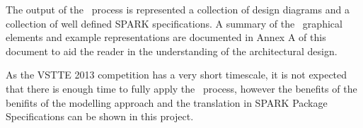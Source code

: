 The output of the \informed\ process is represented a collection of design diagrams and a collection
of well defined SPARK specifications. A summary of the \informed\ graphical elements and example
representations are documented in Annex A of this document to aid the reader in the understanding of 
the architectural design.

As the VSTTE 2013 competition has a very short timescale, it is not expected that there is enough
time to fully apply the \informed\ process, however the benefits of the benifits of the modelling
approach and the translation in SPARK Package Specifications can be shown in this project.
